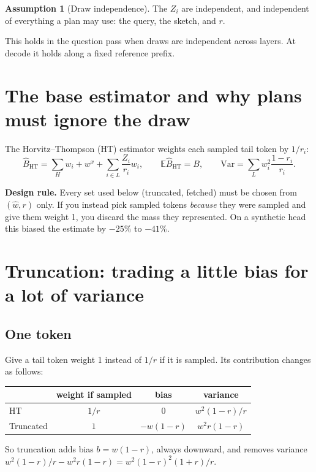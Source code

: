 \documentclass[11pt]{article}
\theoremstyle{definition}
\newtheorem{assumption}{Assumption}
\theoremstyle{remark}
\begin{document}
\begin{assumption}[Draw independence]\label{a1}
The $Z_i$ are independent, and independent of everything a plan may use: the query, the sketch, and $r$.
\end{assumption}

This holds in the question pass when draws are independent across layers. At decode it holds along a fixed reference
prefix.

\section{The base estimator and why plans must ignore the draw}

The Horvitz--Thompson (HT) estimator weights each sampled tail token by $1/r_i$:
\[ \hat B_{\mathrm{HT}} = \sum_H w_i + w^x + \sum_{i \in L} \frac{Z_i}{r_i} w_i, \qquad \mathbb E \hat B_{\mathrm{HT}} = B,
\qquad \mathrm{Var} = \sum_L w_i^2 \frac{1 - r_i}{r_i}. \]

\textbf{Design rule.} Every set used below (truncated, fetched) must be chosen from $(\hat w, r)$ only. If you instead pick
sampled tokens \emph{because} they were sampled and give them weight 1, you discard the mass they represented. On a
synthetic head this biased the estimate by $-25\%$ to $-41\%$.

\section{Truncation: trading a little bias for a lot of variance}

\subsection{One token}

Give a tail token weight 1 instead of $1/r$ if it is sampled. Its contribution changes as follows:
\begin{center}
\begin{tabular}{lccc}\toprule
 & weight if sampled & bias & variance \\ \midrule
HT & $1/r$ & $0$ & $w^2(1-r)/r$ \\
Truncated & $1$ & $-w(1-r)$ & $w^2 r(1-r)$ \\ \bottomrule
\end{tabular}
\end{center}
So truncation adds bias $b = w(1-r)$, always downward, and removes variance $w^2(1-r)/r - w^2 r(1-r) = w^2(1-r)^2(1+r)/r$.
\end{document}
